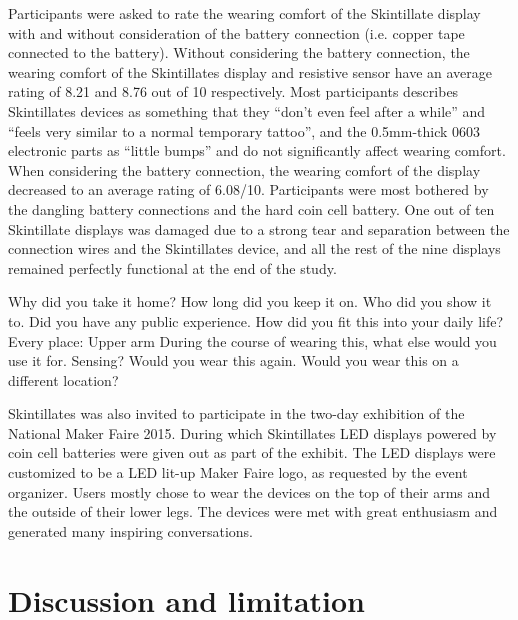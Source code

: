 \documentclass{sigchi}
\newcommand{\ignore}[1]{}
\begin{document}
Participants were asked to rate the wearing comfort of the Skintillate display with and without consideration of the battery connection (i.e. copper tape connected to the battery). Without considering the battery connection, the wearing comfort of the Skintillates display and resistive sensor have an average rating of 8.21 and 8.76 out of 10 respectively. Most participants describes Skintillates devices as something that they ``don't even feel after a while'' and ``feels very similar to a normal temporary tattoo'', and the 0.5mm-thick 0603 electronic parts as ``little bumps'' and do not significantly affect wearing comfort. When considering the battery connection, the wearing comfort of the display decreased to an average rating of 6.08/10. Participants were most bothered by the dangling battery connections and the hard coin cell battery. One out of ten Skintillate displays was damaged due to a strong tear and separation between the connection wires and the Skintillates device, and all the rest of the nine displays remained perfectly functional at the end of the study.

Why did you take it home? How long did you keep it on. Who did you show it to. Did you have any public experience. How did you fit this into your daily life? 
Every place: 
Upper arm 
During the course of wearing this, what else would you use it for. Sensing? 
Would you wear this again. Would you wear this on a different location?  

Skintillates was also invited to participate in the two-day exhibition of the National Maker Faire 2015. During which Skintillates LED displays powered by coin cell batteries were given out as part of the exhibit. The LED displays were customized to be a LED lit-up Maker Faire logo, as requested by the event organizer. Users mostly chose to wear the devices on the top of their arms and the outside of their lower legs. The devices were met with great enthusiasm and generated many inspiring conversations. \ignore{In particular, the displays worn by the event organizer led many Maker Faire participants and potential academic collaborators to visit our booth and offer application suggestions such as displays for events like Burning Man, medical electrodes for children, or custom motion controller for robots.} 





\section {Discussion and limitation}
\end{document}
